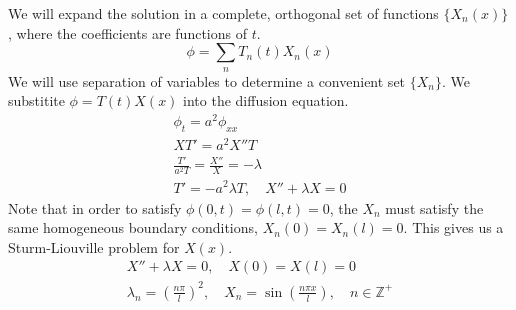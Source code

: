 {\begin{Solution}
\end{Solution}










\begin{Solution}
  \label{solution diffusion equation zero bc}
  We will expand the solution in a complete, orthogonal set of functions
  $\{X_n(x)\}$, where the coefficients are functions of $t$.
  \[
  \phi = \sum_n T_n(t) X_n(x)
  \]
  We will use separation of variables to determine a convenient set $\{X_n\}$.
  We substitite $\phi = T(t) X(x)$ into the diffusion equation.
  \begin{gather*}
    \phi_t = a^2 \phi_{x x} \\
    X T' = a^2 X'' T \\
    \frac{T'}{a^2 T} = \frac{X''}{X} = - \lambda \\
    T' = -a^2 \lambda T, \quad X'' + \lambda X = 0
  \end{gather*}
  Note that in order to satisfy 
  $\phi(0,t) = \phi(l,t) = 0$, the $X_n$ must satisfy the same homogeneous
  boundary conditions, $X_n(0) = X_n(l) = 0$.  This gives us a 
  Sturm-Liouville problem for $X(x)$.
  \begin{gather*}
    X'' + \lambda X = 0, \quad X(0) = X(l) = 0 \\
    \lambda_n = \left( \frac{n \pi}{l} \right)^2, \quad
    X_n = \sin \left( \frac{n \pi x}{l} \right), \quad 
    n \in \mathbb{Z}^+
  \end{gather*}


\end{Solution}}

